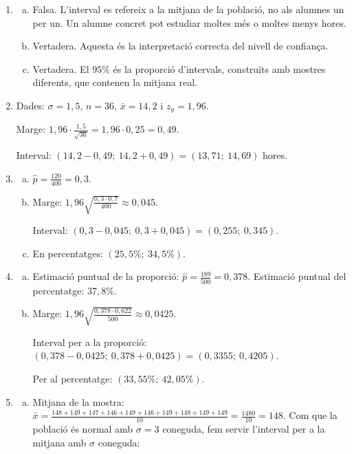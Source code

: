 \begin{enumerate}
 \item
 \begin{enumerate}[a)]
  \item Falsa. L'interval es refereix a la mitjana de la població, no als alumnes un per un. Un alumne concret pot estudiar moltes més o moltes menys hores.
  \item Vertadera. Aquesta és la interpretació correcta del nivell de confiança.
  \item Vertadera. El $95\%$ és la proporció d'intervals, construïts amb mostres diferents, que contenen la mitjana real.
 \end{enumerate}

 \item Dades: $\sigma=1{,}5$, $n=36$, $\bar{x}=14{,}2$ i $z_y=1{,}96$.

 Marge: $1{,}96\cdot\frac{1{,}5}{\sqrt{36}}=1{,}96\cdot0{,}25=0{,}49$.

 Interval: $(14{,}2-0{,}49;\ 14{,}2+0{,}49)=(13{,}71;\ 14{,}69)$ hores.

 \item
 \begin{enumerate}[a)]
  \item $\hat{p}=\frac{120}{400}=0{,}3$.
  \item Marge: $1{,}96\sqrt{\frac{0{,}3\cdot0{,}7}{400}}\approx0{,}045$.

  Interval: $(0{,}3-0{,}045;\ 0{,}3+0{,}045)=(0{,}255;\ 0{,}345)$.
  \item En percentatges: $(25{,}5\%;\ 34{,}5\%)$.
 \end{enumerate}

 \item
 \begin{enumerate}[a)]
  \item Estimació puntual de la proporció: $\hat{p}=\frac{189}{500}=0{,}378$. Estimació puntual del percentatge: $37{,}8\%$.
  \item Marge: $1{,}96\sqrt{\frac{0{,}378\cdot0{,}622}{500}}\approx0{,}0425$.

  Interval per a la proporció: $(0{,}378-0{,}0425;\ 0{,}378+0{,}0425)=(0{,}3355;\ 0{,}4205)$.

  Per al percentatge: $(33{,}55\%;\ 42{,}05\%)$.
 \end{enumerate}

 \item
 \begin{enumerate}[a)]
  \item Mitjana de la mostra: $\bar{x}=\frac{148+149+147+146+149+146+149+148+149+149}{10}=\frac{1480}{10}=148$. Com que la població és normal amb $\sigma=3$ coneguda, fem servir l'interval per a la mitjana amb $\sigma$ coneguda:


\end{enumerate}
\end{enumerate}
